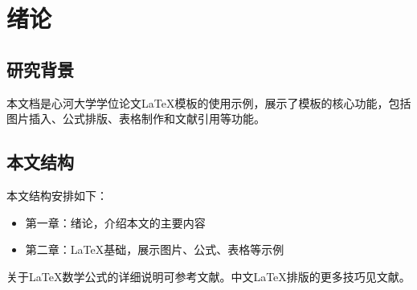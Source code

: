 
\chapter{绪论}

\section{研究背景}

本文档是心河大学学位论文LaTeX模板的使用示例，展示了模板的核心功能\cite{lamport1994latex}，包括图片插入、公式排版、表格制作和文献引用等功能\cite{mittelbach2004latex}。

\section{本文结构}

本文结构安排如下：

\begin{itemize}
    \item 第一章：绪论，介绍本文的主要内容
    \item 第二章：LaTeX基础，展示图片、公式、表格等示例
\end{itemize}

关于LaTeX数学公式的详细说明可参考文献\cite{knuth1984texbook}。中文LaTeX排版的更多技巧见文献\cite{liuhaiyang2013latex}。
